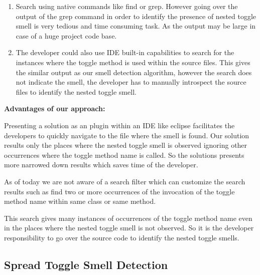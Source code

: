 \documentclass[conference]{IEEEtran}
\begin{document}
\begin{enumerate}
\item{Search using native commands like find or grep. However going over the output of the grep command in order to identify the presence of nested toggle smell is very tedious and time consuming task. As the output may be large in case of a huge project code base.}
\item{The developer could also use IDE built-in capabilities to search for the instances where the toggle method is used within the source files. This gives the similar output as our smell detection algorithm, however the search does not indicate the smell, the developer has to manually introspect the source files to identify the nested toggle smell.}\\
\end{enumerate}

\textbf{Advantages of our approach: }

Presenting a solution as an plugin within an IDE like eclipse facilitates the developers to quickly navigate to the file where the smell is found. Our solution results only the places where the nested toggle smell is observed ignoring other occurrences where the toggle method name is called. So the solutions presents more narrowed down results which saves time of the developer.

As of today we are not aware of a search filter which can customize the search results such as find two or more occurrences of the invocation of the toggle method name within same class or same method. 

This search gives many instances of occurrences of the toggle method name even in the places where the nested toggle smell is not observed. So it is the developer responsibility to go over the source code to identify the nested toggle smells.

\subsection{Spread Toggle Smell Detection}
\end{document}
